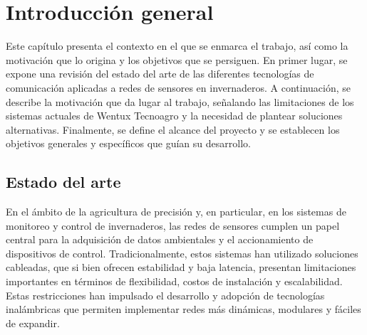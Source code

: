 
\chapter{Introducción general} %

\label{Chapter1} %
\label{IntroGeneral}

Este capítulo presenta el contexto en el que se enmarca el trabajo, así como la motivación que lo origina y los objetivos que se persiguen. En primer lugar, se expone una revisión del estado del arte de las diferentes tecnologías de comunicación aplicadas a redes de sensores en invernaderos. A continuación, se describe la motivación que da lugar al trabajo, señalando las limitaciones de los sistemas actuales de Wentux Tecnoagro y la necesidad de plantear soluciones alternativas. Finalmente, se define el alcance del proyecto y se establecen los objetivos generales y específicos que guían su desarrollo.



\newcommand{\keyword}[1]{\textbf{#1}}
\newcommand{\tabhead}[1]{\textbf{#1}}
\newcommand{\code}[1]{\texttt{#1}}
\newcommand{\file}[1]{\texttt{\bfseries#1}}
\newcommand{\option}[1]{\texttt{\itshape#1}}
\newcommand{\grados}{$^{\circ}$}


\section{Estado del arte}

En el ámbito de la agricultura de precisión y, en particular, en los sistemas de monitoreo y control de invernaderos, las redes de sensores cumplen un papel central para la adquisición de datos ambientales y el accionamiento de dispositivos de control. Tradicionalmente, estos sistemas han utilizado soluciones cableadas, que si bien ofrecen estabilidad y baja latencia, presentan limitaciones importantes en términos de flexibilidad, costos de instalación y escalabilidad. Estas restricciones han impulsado el desarrollo y adopción de tecnologías inalámbricas que permiten implementar redes más dinámicas, modulares y fáciles de expandir.


